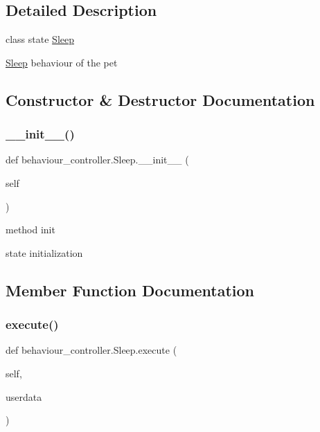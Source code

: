 \subsection{Detailed Description}
class state \hyperlink{classbehaviour__controller_1_1Sleep}{Sleep} 

\hyperlink{classbehaviour__controller_1_1Sleep}{Sleep} behaviour of the pet 

\subsection{Constructor \& Destructor Documentation}
\mbox{\label{classbehaviour__controller_1_1Sleep_afb1c72731d2499a8930ee354f37ca7ad}} 
\subsubsection{\texorpdfstring{\+\_\+\+\_\+init\+\_\+\+\_\+()}{\_\_init\_\_()}}
{\footnotesize\ttfamily def behaviour\+\_\+controller.\+Sleep.\+\_\+\+\_\+init\+\_\+\+\_\+ (\begin{DoxyParamCaption}\item[{}]{self }\end{DoxyParamCaption})}



method init 

state initialization 

\subsection{Member Function Documentation}
\mbox{\label{classbehaviour__controller_1_1Sleep_ae087af71e4af7b6a0967ddcaeecfe346}} 
\subsubsection{\texorpdfstring{execute()}{execute()}}
{\footnotesize\ttfamily def behaviour\+\_\+controller.\+Sleep.\+execute (\begin{DoxyParamCaption}\item[{}]{self,  }\item[{}]{userdata }\end{DoxyParamCaption})}



